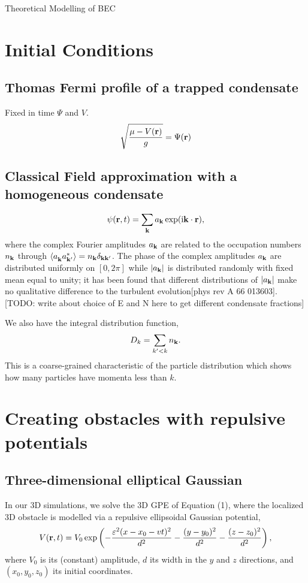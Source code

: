 \begin{chapter}{\label{cha:theoretical_model}Theoretical Modelling of BEC}
\section{\label{section:inital} Initial Conditions}
	\subsection{\label{section:tftrap} Thomas Fermi profile of a trapped condensate}
	Fixed in time $\Psi$ and $V$.
	\begin{equation}
	\sqrt{\frac{\mu - V({\bf r})}{g}} =  \Psi({\bf r})
	\label{eq:TF}
	\end{equation}
	\subsection{\label{section:cfield} Classical Field approximation with a homogeneous condensate}
		\begin{equation}
		\psi({\bf r},t) = \sum_{\bf k} a_{\bf k} \exp (\mathrm{i}{\bf k}\cdot{\bf r}),
		\label{eq:cFieldIC}
		\end{equation}
		where the complex Fourier amplitudes $a_{\bf k}$ are related to the occupation numbers $n_{\bf k}$ through $\braket{a_{\bf k}^{\,}a_{\bf k'}^*} = n_{\bf k}\delta_{\bf kk'}$. The phase of the complex amplitudes $a_{\bf k}$ are distributed uniformly on $[0,2\pi]$ while $|a_{\bf k}|$ is distributed randomly with fixed mean equal to unity; it has been found that different distributions of $|a_{\bf k}|$ make no qualitative difference to the turbulent evolution[phys rev A 66 013603]. [TODO: write about choice of E and N here to get different condensate fractions]

		We also have the integral distribution function,
		\begin{equation}
		D_k = \sum_{k'<k}n_{\bf k}.
		\label{eq:intDistFunc}
		\end{equation}
		This is a coarse-grained characteristic of the particle distribution which shows how many particles have momenta less than $k$.

\section{\label{section:potentials}Creating obstacles with repulsive potentials}

\subsection{\label{section:3dobjpotential} Three-dimensional elliptical Gaussian}
In our 3D simulations, we solve the 3D GPE of Equation (1), where the localized 3D obstacle is modelled via a repulsive ellipsoidal Gaussian potential,
\begin{equation}
V({\bf r}, t)=V_0 \exp \left( -\frac{\varepsilon^2(x-x_0-vt)^2}{d^2} -\frac{(y-y_0)^2}{d^2}-\frac{(z-z_0)^2}{d^2}\right),
\label{eq:potential3D}
\end{equation}
where  $V_0$ is its (constant) amplitude, $d$ its width in the $y$ and $z$ directions, and $(x_0,y_0,z_0)$ its initial coordinates.  


\end{chapter}
